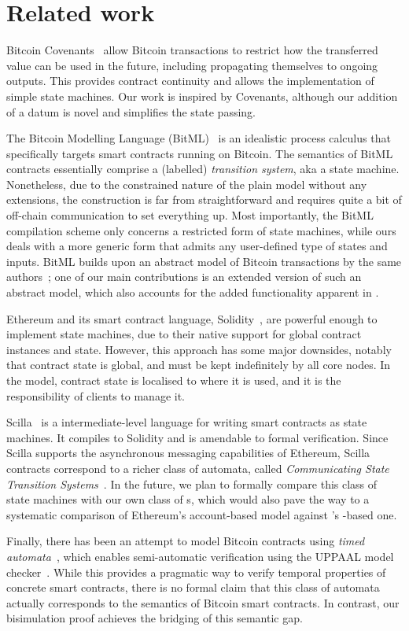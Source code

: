 \section{Related work}
\label{sec:related}

Bitcoin Covenants~\cite{moser2016bitcoin} allow Bitcoin transactions
to restrict how the transferred value can be used in the future,
including propagating themselves to ongoing outputs. This provides
contract continuity and allows the implementation of simple state
machines. Our work is inspired by Covenants, although our addition of
a datum is novel and simplifies the state passing.

The Bitcoin Modelling Language (BitML)~\cite{bitml} is an idealistic process calculus
that specifically targets smart contracts running on Bitcoin.
The semantics of BitML contracts essentially comprise a (labelled) \textit{transition system}, aka a state machine.
Nonetheless, due to the constrained nature of the plain \UTXO{} model without any extensions,
the construction is far from straightforward and requires quite a bit of off-chain communication to set everything up.
Most importantly, the BitML compilation scheme only concerns a restricted form of state machines,
while ours deals with a more generic form that admits any user-defined type of states and inputs.
BitML builds upon an abstract model of Bitcoin transactions by the same
authors~\cite{formal-model-of-bitcoin-transactions};
one of our main contributions is an extended version of such an abstract model,
which also accounts for the added functionality apparent in \Bcc{}.

Ethereum and its smart contract language, Solidity~\cite{Solidity}, are powerful
enough to implement state machines, due to their native support for
global contract instances and state. However, this approach has some major downsides,
notably that contract state is global, and must be kept indefinitely by all core nodes.
In the \EUTXO{} model, contract state is localised to where it is used, and
it is the responsibility of clients to manage it.

Scilla~\cite{scilla} is a intermediate-level language for writing smart
contracts as state machines. It compiles to Solidity and is amendable to formal verification.
Since Scilla supports the asynchronous messaging capabilities of Ethereum,
Scilla contracts correspond to a richer class of automata, called
\textit{Communicating State Transition Systems}~\cite{csta}.
In the future, we plan to formally compare this class of state machines with our own class of \CEM{}s,
which would also pave the way to a systematic comparison of Ethereum's account-based model against \Bcc{}'s \UTXO{}-based one.

Finally, there has been an attempt to model Bitcoin contracts using \textit{timed automata}~\cite{timed-btc},
which enables semi-automatic verification using the UPPAAL model checker~\cite{uppaal}.
While this provides a pragmatic way to verify temporal properties of concrete smart contracts,
there is no formal claim that this class of automata actually corresponds to the semantics of Bitcoin smart contracts.
In contrast, our bisimulation proof achieves the bridging of this semantic gap.

